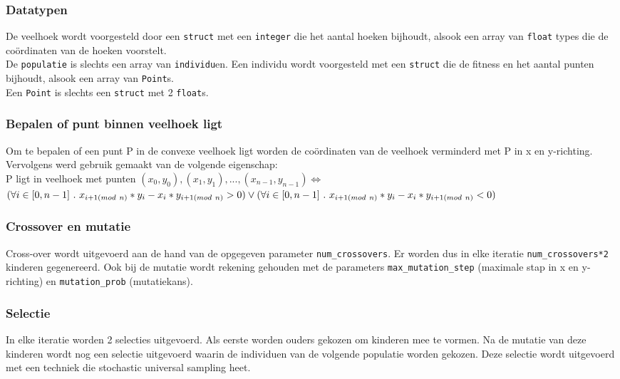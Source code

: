 \documentclass[]{article}
\begin{document}
\subsubsection{Datatypen}
De veelhoek wordt voorgesteld door een \texttt{struct} met een \texttt{integer} die het aantal hoeken bijhoudt, alsook een array van \texttt{float} types die de co\"ordinaten van de hoeken voorstelt.\\[5pt]
De \texttt{populatie} is slechts een array van \texttt{individu}en. Een individu wordt voorgesteld met een \texttt{struct} die de fitness en het aantal punten bijhoudt, alsook een array van \texttt{Point}s.\\[5pt]
Een \texttt{Point} is slechts een \texttt{struct} met 2 \texttt{float}s.

\subsubsection{Bepalen of punt binnen veelhoek ligt}
Om te bepalen of een punt P in de convexe veelhoek ligt worden de co\"ordinaten van de veelhoek verminderd met P in x en y-richting.
Vervolgens werd gebruik gemaakt van de volgende eigenschap:\\[10pt]
P ligt in veelhoek met punten $({x_0}, {y_0}), ({x_1}, {y_1}), ..., ({x_{n-1}}, {y_{n-1}}) \Leftrightarrow$\\
$ (\forall i \in [0,n-1]\ .\ x_{i+1 (mod\ n)}*y_{i}-x_{i}*y_{i+1 (mod\ n)} > 0) \vee \\(\forall i \in [0,n-1]\ .\ x_{i+1 (mod\ n)}*y_{i}-x_{i}*y_{i+1 (mod\ n)} < 0) $

\subsubsection{Crossover en mutatie}
Cross-over wordt uitgevoerd aan de hand van de opgegeven parameter \texttt{num\_crossovers}. Er worden dus in elke iteratie \texttt{num\_crossovers*2} kinderen gegenereerd.
Ook bij de mutatie wordt rekening gehouden met de parameters \texttt{max\_mutation\_step} (maximale stap in x en y-richting) en \texttt{mutation\_prob} (mutatiekans).

\subsubsection{Selectie}
In elke iteratie worden 2 selecties uitgevoerd. Als eerste worden ouders gekozen om kinderen mee te vormen. Na de mutatie van deze kinderen wordt nog een selectie uitgevoerd
waarin de individuen van de volgende populatie worden gekozen. Deze selectie wordt uitgevoerd met een techniek die stochastic universal sampling heet.\\
\end{document}
